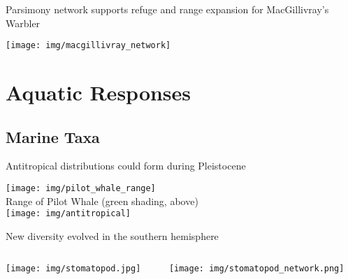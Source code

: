 \documentclass[xcolor=svgnames]{beamer}
\begin{document}
\begin{frame}[plain]
\end{frame}

\begin{frame}{Parsimony network supports refuge and range expansion for MacGillivray's Warbler}
	\begin{center}
		\texttt{[image: img/macgillivray\_network]}
	\end{center}
\end{frame}

\section{Aquatic Responses}

\subsection{Marine Taxa}

\begin{frame}{Antitropical distributions could form during Pleistocene}
	\begin{center}
		\texttt{[image: img/pilot\_whale\_range]}\\
		\scriptsize{Range of Pilot Whale (green shading, above)}\\
		\vspace*{0.25cm}
		\texttt{[image: img/antitropical]}
	\end{center}
\end{frame}

\begin{frame}{New diversity evolved in the southern hemisphere}
	\vspace{-1cm}
	\begin{columns}[T]
		\begin{column}{0.45\textwidth}
			\begin{center}
				\texttt{[image: img/stomatopod.jpg]}
			\end{center}
		\end{column}
		\begin{column}{0.45\textwidth}
			\begin{center}
				\texttt{[image: img/stomatopod\_network.png]}
			\end{center}
		\end{column}
	\end{columns}
\end{frame}
\end{document}
